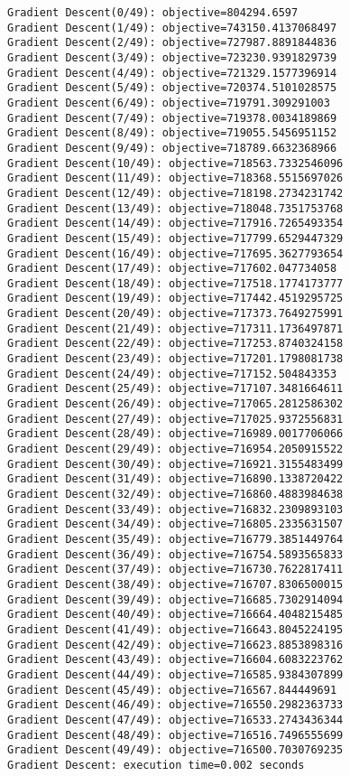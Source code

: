\documentclass[11pt]{article}
\begin{document}
    \begin{Verbatim}[commandchars=\\\{\}]
Gradient Descent(0/49): objective=804294.6597
Gradient Descent(1/49): objective=743150.4137068497
Gradient Descent(2/49): objective=727987.8891844836
Gradient Descent(3/49): objective=723230.9391829739
Gradient Descent(4/49): objective=721329.1577396914
Gradient Descent(5/49): objective=720374.5101028575
Gradient Descent(6/49): objective=719791.309291003
Gradient Descent(7/49): objective=719378.0034189869
Gradient Descent(8/49): objective=719055.5456951152
Gradient Descent(9/49): objective=718789.6632368966
Gradient Descent(10/49): objective=718563.7332546096
Gradient Descent(11/49): objective=718368.5515697026
Gradient Descent(12/49): objective=718198.2734231742
Gradient Descent(13/49): objective=718048.7351753768
Gradient Descent(14/49): objective=717916.7265493354
Gradient Descent(15/49): objective=717799.6529447329
Gradient Descent(16/49): objective=717695.3627793654
Gradient Descent(17/49): objective=717602.047734058
Gradient Descent(18/49): objective=717518.1774173777
Gradient Descent(19/49): objective=717442.4519295725
Gradient Descent(20/49): objective=717373.7649275991
Gradient Descent(21/49): objective=717311.1736497871
Gradient Descent(22/49): objective=717253.8740324158
Gradient Descent(23/49): objective=717201.1798081738
Gradient Descent(24/49): objective=717152.504843353
Gradient Descent(25/49): objective=717107.3481664611
Gradient Descent(26/49): objective=717065.2812586302
Gradient Descent(27/49): objective=717025.9372556831
Gradient Descent(28/49): objective=716989.0017706066
Gradient Descent(29/49): objective=716954.2050915522
Gradient Descent(30/49): objective=716921.3155483499
Gradient Descent(31/49): objective=716890.1338720422
Gradient Descent(32/49): objective=716860.4883984638
Gradient Descent(33/49): objective=716832.2309893103
Gradient Descent(34/49): objective=716805.2335631507
Gradient Descent(35/49): objective=716779.3851449764
Gradient Descent(36/49): objective=716754.5893565833
Gradient Descent(37/49): objective=716730.7622817411
Gradient Descent(38/49): objective=716707.8306500015
Gradient Descent(39/49): objective=716685.7302914094
Gradient Descent(40/49): objective=716664.4048215485
Gradient Descent(41/49): objective=716643.8045224195
Gradient Descent(42/49): objective=716623.8853898316
Gradient Descent(43/49): objective=716604.6083223762
Gradient Descent(44/49): objective=716585.9384307899
Gradient Descent(45/49): objective=716567.844449691
Gradient Descent(46/49): objective=716550.2982363733
Gradient Descent(47/49): objective=716533.2743436344
Gradient Descent(48/49): objective=716516.7496555699
Gradient Descent(49/49): objective=716500.7030769235
Gradient Descent: execution time=0.002 seconds
    \end{Verbatim}
\end{document}
